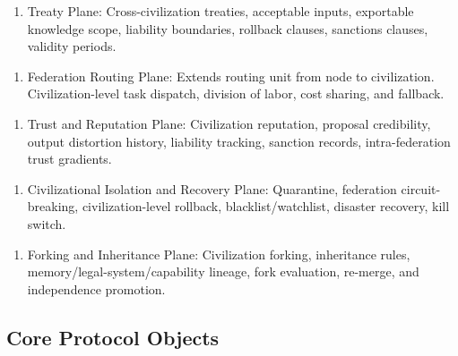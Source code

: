 \documentclass[12pt,a4paper]{article}
\begin{document}
\begin{enumerate}
  \item Treaty Plane: Cross-civilization treaties, acceptable inputs, exportable knowledge scope, liability boundaries, rollback clauses, sanctions clauses, validity periods.
\end{enumerate}

\begin{enumerate}
  \item Federation Routing Plane: Extends routing unit from node to civilization. Civilization-level task dispatch, division of labor, cost sharing, and fallback.
\end{enumerate}

\begin{enumerate}
  \item Trust and Reputation Plane: Civilization reputation, proposal credibility, output distortion history, liability tracking, sanction records, intra-federation trust gradients.
\end{enumerate}

\begin{enumerate}
  \item Civilizational Isolation and Recovery Plane: Quarantine, federation circuit-breaking, civilization-level rollback, blacklist/watchlist, disaster recovery, kill switch.
\end{enumerate}

\begin{enumerate}
  \item Forking and Inheritance Plane: Civilization forking, inheritance rules, memory/legal-system/capability lineage, fork evaluation, re-merge, and independence promotion.
\end{enumerate}

\subsection{Core Protocol Objects}
\end{document}
